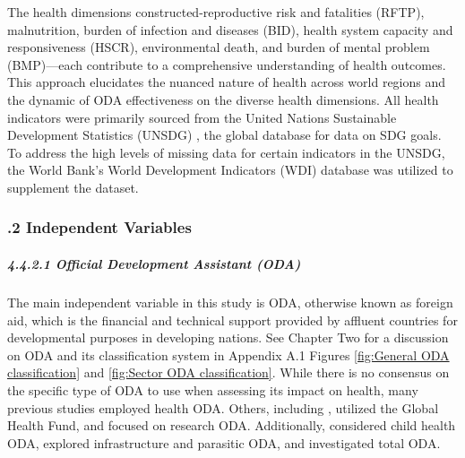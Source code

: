 The health dimensions constructed-reproductive risk and fatalities (RFTP), malnutrition, burden of infection and diseases (BID), health system capacity and responsiveness (HSCR), environmental death, and burden of mental problem (BMP)—each contribute to a comprehensive understanding of health outcomes. This approach elucidates the nuanced nature of health across world regions and the dynamic of ODA effectiveness on the diverse health dimensions. All health indicators were primarily sourced from the United Nations Sustainable Development Statistics (UNSDG) \parencite{unsdg_sustainable_2023}, the global database for data on SDG goals. To address the high levels of missing data for certain indicators in the UNSDG, the World Bank's World Development Indicators (WDI) database \parencite{wdi_world_2023} was utilized to supplement the dataset.

\subsubsection*{.2 Independent Variables} 
\paragraph{\quad \quad \textit{4.4.2.1 Official Development Assistant (ODA)}}
\subparagraph{}
The main independent variable in this study is ODA, otherwise known as foreign aid, which is the financial and technical support provided by affluent countries for developmental purposes in developing nations. See Chapter Two for a discussion on ODA and its classification system in Appendix A.1 Figures \ref{fig:General ODA classification} and \ref{fig:Sector ODA classification}. While there is no consensus on the specific type of ODA to use when assessing its impact on health, many previous studies \parencite[e.g.,][]{nwude_official_2020, odokonyero_impact_2018} employed health ODA. Others, including \textcite{yan_mortality_2015, kavanagh_governance_2019, ali_foreign_2020, yogo_health_2015}, utilized the Global Health Fund, and \textcite{cassola_evaluating_2022} focused on research ODA. Additionally, \textcite{bavinger_relationship_2017} considered child health ODA, \textcite{marty_taking_2017} explored infrastructure and parasitic ODA, and \textcite{staicu2017study, akinola_foreign_2022} investigated total ODA. 


